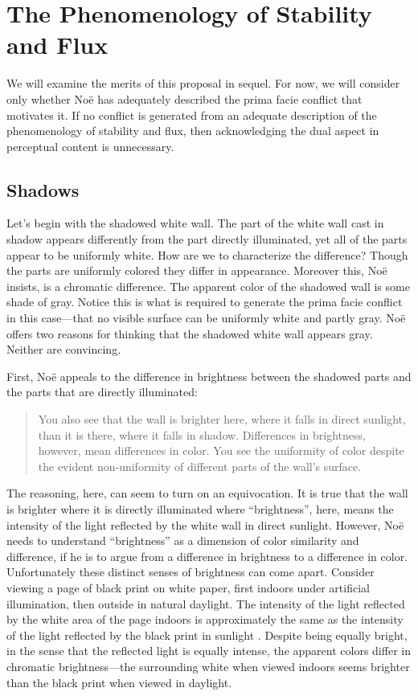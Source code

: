 \documentclass[12pt]{article}
\begin{document}

\section{The Phenomenology of Stability and Flux}\label{sec:stability_and_flux} %

We will examine the merits of this proposal in sequel. For now, we will consider only whether Noë has adequately described the prima facie conflict that motivates it. If no conflict is generated from an adequate description of the phenomenology of stability and flux, then acknowledging the dual aspect in perceptual content is unnecessary.

\subsection{Shadows} %
\label{sub:shadows}

Let's begin with the shadowed white wall. The part of the white wall cast in shadow appears differently from the part directly illuminated, yet all of the parts appear to be uniformly white. How are we to characterize the difference? Though the parts are uniformly colored they differ in appearance. Moreover this, Noë insists, is a chromatic difference. The apparent color of the shadowed wall is some shade of gray. Notice this is what is required to generate the prima facie conflict in this case---that no visible surface can be uniformly white and partly gray. Noë offers two reasons for thinking that the shadowed white wall appears gray. Neither are convincing.

First, Noë appeals to the difference in brightness between the shadowed parts and the parts that are directly illuminated:
	\begin{quote}
		You also see that the wall is brighter here, where it falls in direct sunlight, than it is there, where it falls in shadow. Differences in brightness, however, mean differences in color. You see the uniformity of color despite the evident non-uniformity of different parts of the wall's surface. \citep[127]{Noe:2004fk}
	\end{quote}
The reasoning, here, can seem to turn on an equivocation. It is true that the wall is brighter where it is directly illuminated where ``brightness'', here, means the intensity of the light reflected by the white wall in direct sunlight. However, Noë needs to understand ``brightness'' as a dimension of color similarity and difference, if he is to argue from a difference in brightness to a difference in color. Unfortunately these distinct senses of brightness can come apart. Consider viewing a page of black print on white paper, first indoors under artificial illumination, then outside in natural daylight. The intensity of the light reflected by the white area of the page indoors is approximately the same as the intensity of the light reflected by the black print in sunlight \citep[199]{Peter-K:1996th}. Despite being equally bright, in the sense that the reflected light is equally intense, the apparent colors differ in chromatic brightness---the surrounding white when viewed indoors seems brighter than the black print when viewed in daylight.
\end{document}
